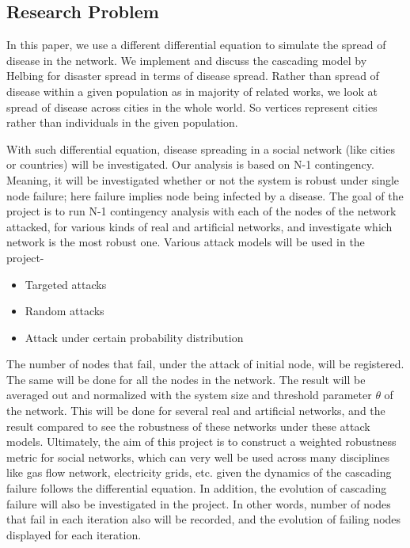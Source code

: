 \documentclass[11pt]{article}
\begin{document}
\subsection{Research Problem}
In this paper, we use a different differential equation to simulate the spread of disease in the network. We implement and discuss the cascading model by Helbing for disaster spread in terms of disease spread. Rather than spread of disease within a given population as in majority of related works, we look at spread of disease across cities in the whole world. So vertices represent cities rather than individuals in the given population.

With such differential equation, disease spreading in a social network (like cities or countries) will be investigated.  Our analysis is based on N-1 contingency. Meaning, it will be investigated whether or not the system is robust under single node failure; here failure implies node being infected by a disease. The goal of the project is to run N-1 contingency analysis with each of the nodes of the network attacked, for various kinds of real and artificial networks, and investigate which network is the most robust one. Various attack models will be used in the project- 

\begin{itemize}
\item Targeted attacks
\item Random attacks
\item Attack under certain probability distribution
\end{itemize}

 The number of nodes that fail, under the attack of initial node, will be registered. The same will be done for all the nodes in the network. The result will be averaged out and normalized with the system size and threshold parameter $\theta$ of the network. This will be done for several real and artificial networks, and the result compared to see the robustness of these networks under these attack models. Ultimately, the aim of this project is to construct a weighted robustness metric for social networks, which can very well be used across many disciplines like gas flow network, electricity grids, etc. given the dynamics of the cascading failure follows the differential equation. In addition, the evolution of cascading failure will also be investigated in the project. In other words, number of nodes that fail in each iteration also will be recorded, and the evolution of failing nodes displayed for each iteration.
\end{document}
